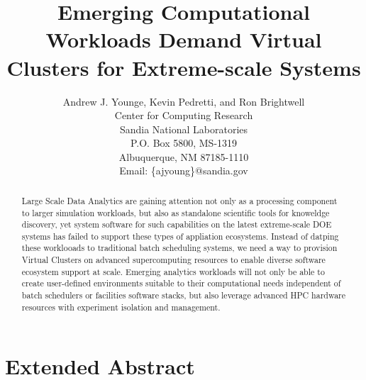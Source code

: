 
\newcommand{\AJY}[1]{{\color{red}\em  AJY: #1}}
\newcommand{\TODO}[1]{{\color{green}\em  TODO: #1}}
\newcommand{\E}[1]{{\color{red}~\blacksquare~\footnote{grammar, spelling, sentence, or other error}~}}

\newcommand{\AUTHOR}{%
Andrew J. Younge, Kevin Pedretti, and Ron Brightwell\\
Center for Computing Research \\
Sandia National Laboratories \\
P.O. Box 5800, MS-1319 \\
Albuquerque, NM 87185-1110 \\
Email: \{ajyoung\}@sandia.gov%
}

\newcommand{\TITLE}{Emerging Computational Workloads Demand Virtual Clusters for Extreme-scale Systems}


\title{\TITLE}
\author{\AUTHOR}

\maketitle

\begin{abstract}
Large Scale Data Analytics are gaining attention not only as a processing component to larger simulation workloads, but also as standalone scientific tools for knoweldge discovery, yet system software for such capabilities on the latest extreme-scale DOE systems has failed to support these types of appliation ecosystems.  Instead of datping these worklooads to traditional batch scheduling systems, we need a way to provision Virtual Clusters on advanced supercomputing resources to enable diverse software ecosystem support at scale. Emerging analytics workloads will not only be able to create user-defined environments suitable to their computational needs independent of batch schedulers or facilities software stacks, but also leverage advanced HPC hardware resources with experiment isolation and management. 
 
\end{abstract}

\section{Extended Abstract}

